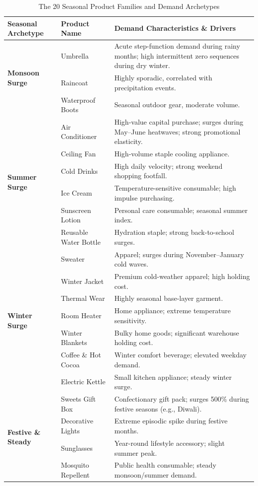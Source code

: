 \documentclass[12pt,a4paper,oneside]{report}
\theoremstyle{definition}
\begin{document}
\begin{table}[H]
\centering
\small
\caption{The 20 Seasonal Product Families and Demand Archetypes}
\label{tab:catalog}
\begin{tabularx}{\textwidth}{llX}
\toprule
\textbf{Seasonal Archetype} & \textbf{Product Name} & \textbf{Demand Characteristics \& Drivers} \\
\midrule
\multirow{3}{*}{\textbf{Monsoon Surge}} 
& Umbrella & Acute step-function demand during rainy months; high intermittent zero sequences during dry winter. \\
& Raincoat & Highly sporadic, correlated with precipitation events. \\
& Waterproof Boots & Seasonal outdoor gear, moderate volume. \\
\midrule
\multirow{6}{*}{\textbf{Summer Surge}} 
& Air Conditioner & High-value capital purchase; surges during May--June heatwaves; strong promotional elasticity. \\
& Ceiling Fan & High-volume staple cooling appliance. \\
& Cold Drinks & High daily velocity; strong weekend shopping footfall. \\
& Ice Cream & Temperature-sensitive consumable; high impulse purchasing. \\
& Sunscreen Lotion & Personal care consumable; seasonal summer index. \\
& Reusable Water Bottle & Hydration staple; strong back-to-school surges. \\
\midrule
\multirow{7}{*}{\textbf{Winter Surge}} 
& Sweater & Apparel; surges during November--January cold waves. \\
& Winter Jacket & Premium cold-weather apparel; high holding cost. \\
& Thermal Wear & Highly seasonal base-layer garment. \\
& Room Heater & Home appliance; extreme temperature sensitivity. \\
& Winter Blankets & Bulky home goods; significant warehouse holding cost. \\
& Coffee \& Hot Cocoa & Winter comfort beverage; elevated weekday demand. \\
& Electric Kettle & Small kitchen appliance; steady winter surge. \\
\midrule
\multirow{4}{*}{\textbf{Festive \& Steady}} 
& Sweets Gift Box & Confectionary gift pack; surges 500\% during festive seasons (e.g., Diwali). \\
& Decorative Lights & Extreme episodic spike during festive months. \\
& Sunglasses & Year-round lifestyle accessory; slight summer peak. \\
& Mosquito Repellent & Public health consumable; steady monsoon/summer demand. \\
\bottomrule
\end{tabularx}
\end{table}
\end{document}
